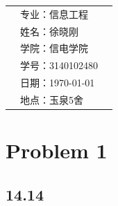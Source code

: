 \documentclass[a4paper,left=2.5cm,right=2.5cm,11pt]{article}
\newcommand{\xiaoerhao}{\fontsize{19.3pt}{\baselineskip}\selectfont}
\begin{document}
	
   \begin{longtable}{p{12cm}p{5cm}p{5cm}}
	\multirow{6}{*}{ \xiaoerhao  \color{red}{Artificial intelligence}} \multirow{6}{*}{ \xiaoerhao Homework4 \space \space \space \space} & 专业：信息工程 \\
	& 姓名：徐晓刚 \\
	& 学院：信电学院 \\
	& 学号：3140102480 \\
	& 日期：\today \\
	& 地点：玉泉5舍 \\
\end{longtable}

\section*{Problem 1}
\subsection*{14.14}
\end{document}
